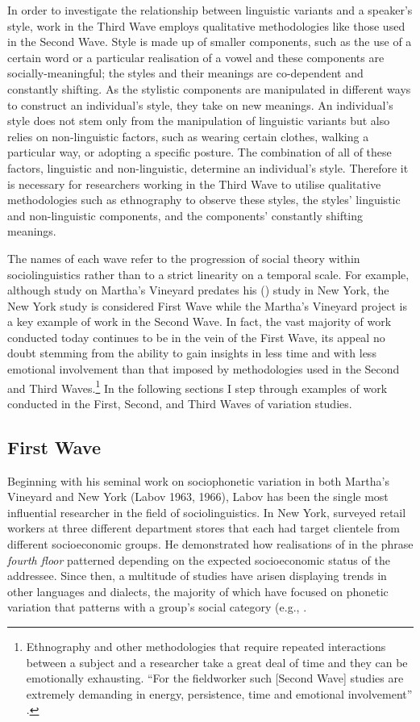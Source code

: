 In order to investigate the relationship between linguistic variants and a spea\-ker's style, work in the Third Wave employs qualitative methodologies like those used in the Second Wave. Style is made up of smaller components, such as the use of a certain word or a particular realisation of a vowel and these components are socially-meaningful; the styles and their meanings are co-dependent and constantly shifting. As the stylistic components are manipulated in different ways to construct an individual's style, they take on new meanings. An individual's style does not stem only from the manipulation of linguistic variants but also relies on non-linguistic factors, such as wearing certain clothes, walking a particular way, or adopting a specific posture. The combination of all of these factors, linguistic and non-linguistic, determine an individual's style. Therefore it is necessary for researchers working in the Third Wave to utilise qualitative methodologies such as ethnography to observe these styles, the styles' linguistic and non-linguistic components, and the components' constantly shifting meanings.

The names of each wave refer to the progression of social theory within sociolinguistics rather than to a strict linearity on a temporal scale. For example, although  study on Martha's Vineyard predates his (\citeyear{labov1966}) study in New York, the New York study is considered First Wave while the Martha's Vineyard project is a key example of work in the Second Wave. In fact, the vast majority of work conducted today continues to be in the vein of the First Wave, its appeal no doubt stemming from the ability to gain insights in less time and with less emotional involvement than that imposed by methodologies used in the Second and Third Waves.\footnote{Ethnography and other methodologies that require repeated interactions between a subject and a researcher take a great deal of time and they can be emotionally exhausting. ``For the fieldworker such [Second Wave] studies are extremely demanding in energy, persistence, time and emotional involvement'' \citep[79]{milroy1987}.}	 In the following sections I step through examples of work conducted in the First, Second, and Third Waves of variation studies.

\subsection{First Wave}

Beginning with his seminal work on sociophonetic variation in both Martha's Vineyard and New York (Labov 1963, 1966), Labov has been the single most influential researcher in the field of sociolinguistics. In New York, \citet{labov1966} surveyed retail workers at three different department stores that each had target clientele from different socioeconomic groups. He demonstrated how realisations of  in the phrase \textit{fourth floor} patterned depending on the expected socioeconomic status of the addressee. Since then, a multitude of studies have arisen displaying trends in other languages and dialects, the majority of which have focused on phonetic variation that patterns with a group's social category (e.g., \cite{trudgill1972,romaine1978,wolfram1974}. 

